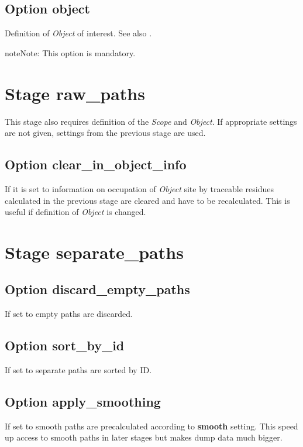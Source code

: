 \documentclass[a4paper,10pt,english]{sphinxmanual}
\begin{document}
\subsection{Option \textbf{object}}
\label{valve/valve_config:option-object}
Definition of \emph{Object} of interest. See also {\hyperref[valve/valve_manual:object\string-definition]{}}.

\begin{notice}{note}{Note:}
This option is mandatory.
\end{notice}


\section{Stage \textbf{raw\_paths}}
\label{valve/valve_config:stage-raw-paths}
This stage also requires definition of the \emph{Scope} and \emph{Object}. If appropriate settings are not given, settings from the previous stage are used.


\subsection{Option \textbf{clear\_in\_object\_info}}
\label{valve/valve_config:option-clear-in-object-info}
If it is set to  information on occupation of \emph{Object} site by traceable residues calculated in the previous stage are cleared and have to be recalculated. This is useful if definition of \emph{Object} is changed.


\section{Stage \textbf{separate\_paths}}
\label{valve/valve_config:stage-separate-paths}

\subsection{Option \textbf{discard\_empty\_paths}}
\label{valve/valve_config:option-discard-empty-paths}
If set to  empty paths are discarded.


\subsection{Option \textbf{sort\_by\_id}}
\label{valve/valve_config:option-sort-by-id}
If set to  separate paths are sorted by ID.


\subsection{Option \textbf{apply\_smoothing}}
\label{valve/valve_config:option-apply-smoothing}
If set to  smooth paths are precalculated according to \textbf{smooth} setting.
This speed up access to smooth paths in later stages but makes dump data much bigger.
\end{document}
